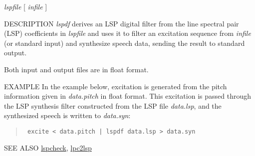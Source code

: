 \begin{synopsis}
\item [lspdf] [ --m $M$ ] [ --p $P$ ] [ --i $I$ ] [ --s $S$ ] [ --o $O$ ] 
              [ --k ] [ --L ] {\em lspfile} [ {\em infile} ] 
\end{synopsis}

\begin{qsection}{DESCRIPTION}
{\em lspdf} derives an LSP digital filter 
from the line spectral pair (LSP) coefficients in {\em lspfile} 
and uses it to filter an excitation sequence
from {\em infile} (or standard input) and synthesize speech data, 
sending the result to standard output.

Both input and output files are in float format.
\end{qsection}

\begin{options}
\end{options}

\begin{qsection}{EXAMPLE}
In the example below, excitation is generated from the
pitch information given in {\em data.pitch} in float format.
This excitation is passed through the LSP synthesis filter
constructed from the LSP file {\em data.lsp},
and the synthesized speech is written to {\em data.syn}:
\begin{quote}
\verb! excite < data.pitch | lspdf data.lsp > data.syn!
\end{quote}
\end{qsection}

\begin{qsection}{SEE ALSO}
\hyperlink{lspcheck}{lspcheck},
\hyperlink{lpc2lsp}{lpc2lsp}
\end{qsection}
